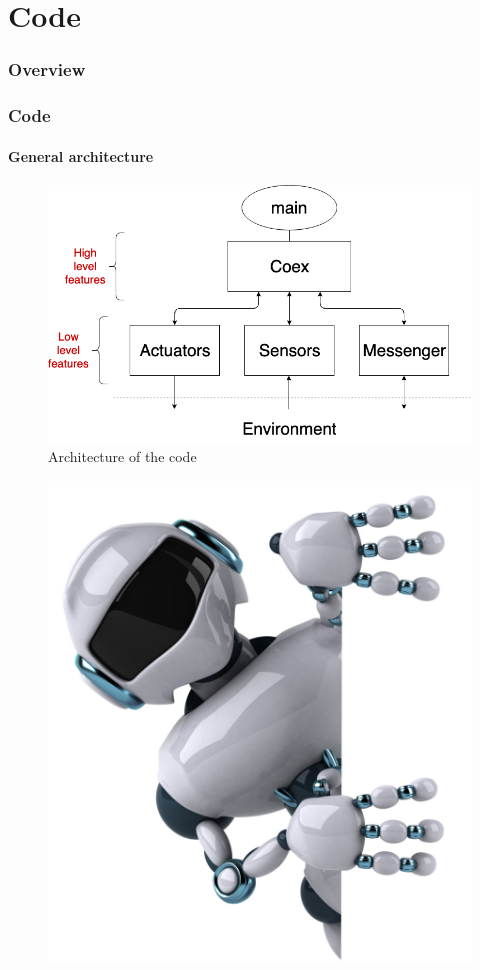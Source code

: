 \documentclass[10pt]{beamer}
\begin{document}
\section{Code} 

\begin{frame}
\frametitle{Overview}
\tableofcontents[currentsection,subsectionstyle=shaded]
\end{frame}

\begin{frame}
\frametitle{Code}
\framesubtitle{General architecture}
\begin{figure}[hbtp]
\centering
\label{fig:architecture}
\includegraphics[scale=0.38]{figures/architecture.png}
\caption{Architecture of the code}
\end{figure}
\end{frame}



\begin{frame}
\begin{figure}[hbtp]
\centering
\includegraphics[scale=0.1]{figures/bye-bye.jpeg}
\end{figure}
\end{frame}

\end{document}

